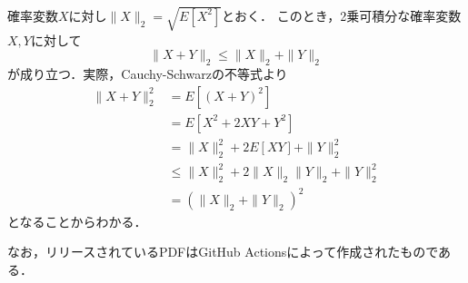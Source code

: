\documentclass{jsarticle}
\begin{document}
確率変数$X$に対し$\|X\|_2=\sqrt{E[X^2]}$とおく．
このとき，2乗可積分な確率変数$X,Y$に対して
\[ \|X+Y\|_2\leq\|X\|_2+\|Y\|_2 \]
が成り立つ．実際，Cauchy-Schwarzの不等式より
\begin{align*}
\|X+Y\|_2^2
&=E[(X+Y)^2] \\
&=E[X^2+2XY+Y^2] \\
&=\|X\|_2^2+2E[XY]+\|Y\|_2^2 \\
&\leq\|X\|_2^2+2\|X\|_2\|Y\|_2+\|Y\|_2^2 \\
&=(\|X\|_2+\|Y\|_2)^2
\end{align*}
となることからわかる．

なお，リリースされているPDFはGitHub Actionsによって作成されたものである．
\end{document}
